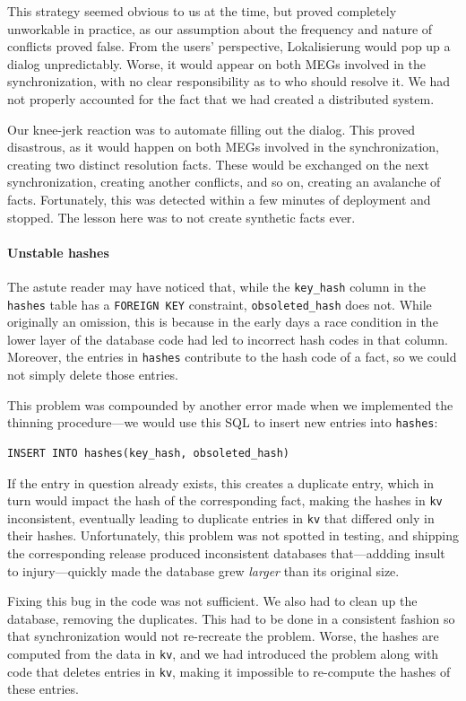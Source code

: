 \documentclass[sigplan,review]{acmart}
\begin{document}
This strategy seemed obvious to us at the time, but proved completely
unworkable in practice, as our assumption about the frequency and
nature of conflicts proved false.  From the users' perspective,
Lokalisierung would pop up a dialog unpredictably.  Worse, it would
appear on both MEGs involved in the synchronization, with no clear
responsibility as to who should resolve it. We had not properly accounted
for the fact that we had created a distributed system.

Our knee-jerk reaction was to automate filling out the dialog.  This
proved disastrous, as it would happen on both MEGs involved in the
synchronization, creating two distinct resolution facts. These would be
exchanged on the next synchronization, creating another conflicts, and
so on, creating an avalanche of facts.  Fortunately, this was detected
within a few minutes of deployment and stopped.  The lesson here was
to not create synthetic facts ever.


\paragraph{Unstable hashes} The astute reader may have noticed that,
while the \texttt{key\_hash} column in the \texttt{hashes} table has a
\texttt{FOREIGN KEY} constraint, \texttt{obsoleted\_hash} does not.
While originally an omission, this is because in the early days a race
condition in the lower layer of the database code had led to incorrect hash codes
in that column.  Moreover, the entries in \texttt{hashes} contribute
to the hash code of a fact, so we could not simply delete those
entries.

This problem was compounded by another error made when we implemented
the thinning procedure---we would use this SQL to insert new
entries into \texttt{hashes}:
%
\begin{verbatim}
INSERT INTO hashes(key_hash, obsoleted_hash)
\end{verbatim}
%
If the entry in question already exists, this creates a duplicate
entry, which in turn would impact the hash of the corresponding fact,
making the hashes in \texttt{kv} inconsistent, eventually leading to
duplicate entries in \texttt{kv} that differed only in their
hashes.  Unfortunately, this problem was not spotted in testing, and
shipping the corresponding release produced inconsistent databases
that---addding insult to injury---quickly made the database grew
\emph{larger} than its original size.

Fixing this bug in the code was not sufficient.  We also had to clean
up the database, removing the duplicates.  This had to be done in a
consistent fashion so that synchronization would not re-recreate the
problem. Worse, the hashes are computed from the data in \texttt{kv},
and we had introduced the problem along with code that deletes entries in
\texttt{kv}, making it impossible to re-compute the hashes
of these entries.
\end{document}
